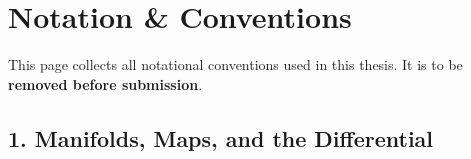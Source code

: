 \section*{Notation \& Conventions}

This page collects all notational conventions used in this thesis.
It is to be \textbf{removed before submission}.

\subsection*{1. Manifolds, Maps, and the Differential}

